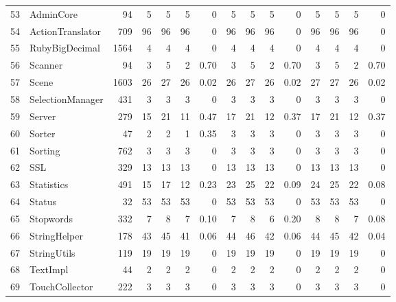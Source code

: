 \documentclass{acm_proc_article-sp}
\begin{document}
\begin{table} [htp!]
{\begin{tabularx}{1.17 \textwidth}{r l r r r r r r r r r r r r r}
 53						& AdminCore					&94		& 5		&	5	&	5	& 	0					& 5		& 5 		& 5		& 		0			& 5			& 5			& 5			&	0\\      
 54						& ActionTranslator				&709		& 96		&	96	&	96	& 	0					& 96		& 96 		& 96		& 		0			& 96			& 96			& 96			&	0\\      
 55						& RubyBigDecimal				&1564		& 4 		&	4	&	4	& 	0					& 4		& 4 		& 4		& 		0			& 4			& 4			& 4			&	0\\      
 56						& Scanner					&94		& 3		&	5	&	2	& 	0.70					& 3		& 5 		& 2		& 		0.70			& 3			& 5			& 2			&	0.70\\      
 57						& Scene					&1603		& 26		&	27	&	26	& 	0.02					& 26		& 27 		& 26		& 		0.02			& 27			& 27			& 26			&	0.02\\      
 58						& SelectionManager				&431		& 3		&	3	&	3	& 	0					& 3		& 3 		& 3		& 		0			& 3			& 3			& 3			&	0\\      
 59						& Server					&279		&15		&	21	&	11	& 	0.47					& 17		& 21 		& 12		& 		0.37			& 17			& 21			& 12			&	0.37\\      
 60						& Sorter					&47		& 2		&	2	&	1	& 	0.35					& 3		& 3 		& 3		& 		0			& 3			& 3			& 3			&	0\\      
 61						& Sorting					&762		& 3		&	3	&	3	& 	0					& 3		& 3 		& 3		& 		0			& 3			& 3			& 3			&	0\\      
 62						& SSL						&329		&13		&	13	&	13	& 	0					& 13		& 13 		& 13		& 		0			& 13			& 13			& 13			&	0\\      
 63						& Statistics					&491		& 15		&	17	&	12	&	0.23					& 23		& 25 		& 22		& 		0.09			& 24			& 25			& 22			&	0.08\\      
 64						& Status					&32		& 53		&	53	&	53	& 	0					& 53		& 53 		& 53		& 		0			& 53			& 53			& 53			&	0\\      
 65						& Stopwords					&332		& 7		&	8	&	7	& 	0.10					& 7		&  8		& 6		& 		0.20			& 8			& 8			& 7			&	0.08\\      
 66						& StringHelper				&178		& 43	 	& 	45	&	41	& 	0.06					& 44		&  46		& 42		& 		0.06			& 44			& 45			& 42			&	0.04\\      
 67						& StringUtils					&119		& 19 		&	19	&	19	& 	0					& 19		& 19 		& 19		& 		0			& 19			& 19			& 19			&	0\\      
 68						& TextImpl					&44		& 2 		&	2	&	2	& 	0					& 2		&  2		& 2		& 		0			& 2			& 2			& 2			&	0\\      
 69						& TouchCollector				&222		& 3		&	3	&	3	& 	0					& 3		&  3		& 3		& 		0			& 3			& 3			& 3			&	0\\      

\end{tabularx}}
\end{table}
\end{document}
